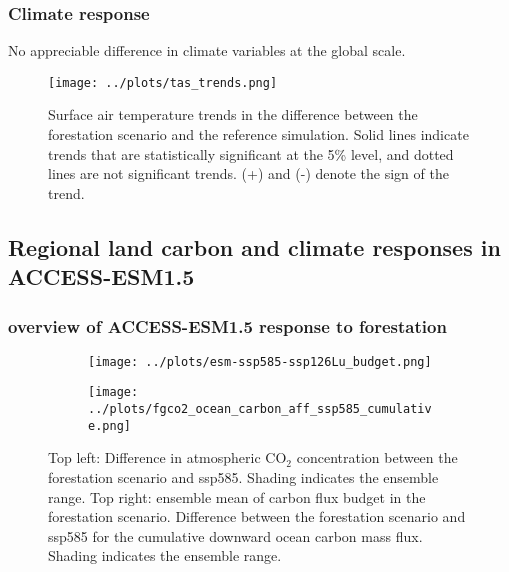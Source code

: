 \documentclass[]{article}
\begin{document}
\subsubsection{Climate response}

No appreciable difference in climate variables at the global scale.

\begin{figure}[H]
    \centering
    \texttt{[image: ../plots/tas\_trends.png]}
    \caption{Surface air temperature trends in the difference between the forestation scenario and the reference simulation. Solid lines indicate trends that are statistically significant at the 5\% level, and dotted lines are not significant trends. (+) and (-) denote the sign of the trend.}
    \label{fig:models_tas_trends}
\end{figure}

\subsection{Regional land carbon and climate responses in ACCESS-ESM1.5}

\subsubsection{overview of ACCESS-ESM1.5 response to forestation}

\begin{figure}[H]
    \centering
    \begin{subfigure}[b]{0.4\linewidth}
        \texttt{[image: ../plots/esm-ssp585-ssp126Lu\_budget.png]}
    \end{subfigure}
    \begin{subfigure}[b]{0.4\linewidth}
        \texttt{[image: ../plots/fgco2\_ocean\_carbon\_aff\_ssp585\_cumulative.png]}
    \end{subfigure}
    \caption{Top left: Difference in atmospheric CO$_2$ concentration between the forestation scenario and ssp585. Shading indicates the ensemble range. Top right: ensemble mean of carbon flux budget in the forestation scenario. Difference between the forestation scenario and ssp585 for the cumulative downward ocean carbon mass flux. Shading indicates the ensemble range.}
    \label{fig:global_carbon_budget}
\end{figure}
\end{document}
